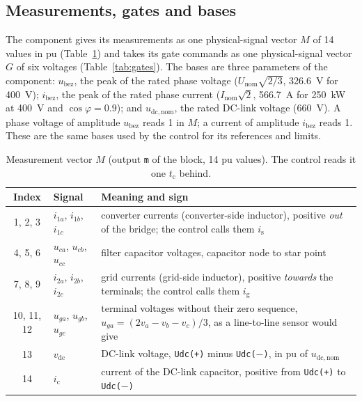 \documentclass[11pt,a4paper]{scrartcl}
\newcommand{\ped}[1]{_{\mathrm{#1}}}
\newcommand{\code}[1]{\texttt{#1}}
\begin{document}
\begin{onehalfspace}
\subsection{Measurements, gates and bases}
\label{sec:meas}

The component gives its measurements as one physical-signal vector $M$ of 14 values in pu (Table~\ref{tab:meas}) and takes its gate commands as one physical-signal vector $G$ of six voltages (Table~\ref{tab:gates}). The bases are three parameters of the component: $u\ped{bez}$, the peak of the rated phase voltage ($U\ped{nom} \sqrt{2/3}$, \SI{326.6}{\volt} for \SI{400}{\volt}); $i\ped{bez}$, the peak of the rated phase current ($I\ped{nom} \sqrt{2}$, \SI{566.7}{\ampere} for \SI{250}{\kilo\watt} at \SI{400}{\volt} and $\cos\varphi = 0.9$); and $u\ped{dc,nom}$, the rated DC-link voltage (\SI{660}{\volt}). A phase voltage of amplitude $u\ped{bez}$ reads 1 in $M$; a current of amplitude $i\ped{bez}$ reads 1. These are the same bases used by the control for its references and limits.

\begin{table}[H]
	\centering
	\captionsetup{width=0.9\textwidth, font=small}
	\caption[Measurement vector of the power stage.]{Measurement vector $M$ (output \code{m} of the block, 14 pu values). The control reads it one $t\ped{c}$ behind.}
	\label{tab:meas}
	\begin{tabularx}{0.95\textwidth}{@{} c l X @{}}
		\toprule
		\textbf{Index} & \textbf{Signal} & \textbf{Meaning and sign} \\
		\midrule
		1, 2, 3 & $i_{1a}$, $i_{1b}$, $i_{1c}$ & converter currents (converter-side inductor), positive \emph{out} of the bridge; the control calls them $i\ped{s}$ \\
		4, 5, 6 & $u_{ca}$, $u_{cb}$, $u_{cc}$ & filter capacitor voltages, capacitor node to star point \\
		7, 8, 9 & $i_{2a}$, $i_{2b}$, $i_{2c}$ & grid currents (grid-side inductor), positive \emph{towards} the terminals; the control calls them $i\ped{g}$ \\
		10, 11, 12 & $u_{ga}$, $u_{gb}$, $u_{gc}$ & terminal voltages without their zero sequence, $u_{ga} = (2 v_a - v_b - v_c)/3$, as a line-to-line sensor would give \\
		13 & $v\ped{dc}$ & DC-link voltage, \code{Udc(+)} minus \code{Udc($-$)}, in pu of $u\ped{dc,nom}$ \\
		14 & $i\ped{c}$ & current of the DC-link capacitor, positive from \code{Udc(+)} to \code{Udc($-$)} \\
		\bottomrule
	\end{tabularx}
\end{table}


\end{onehalfspace}
\end{document}
